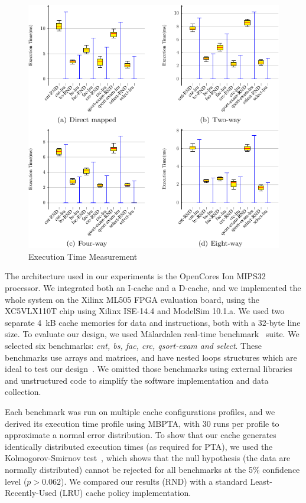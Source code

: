 \begin{figure}[t!]

 \centering
  \captionsetup{justification=centering}    
   \includegraphics[scale=0.8]{figures/img/boxplot.pdf}
   \caption{Execution Time Measurement}
\label{fig:boxplot}
\end{figure}
The architecture used in our experiments is the OpenCores Ion MIPS32
processor. We integrated both an I-cache and a D-cache, and we
implemented the whole system on the Xilinx ML505 FPGA evaluation
board, using the XC5VLX110T chip using  Xilinx ISE-14.4 and ModelSim 10.1.a. We used two separate 4~kB cache
memories for data and instructions, both with a 32-byte line size.  To
evaluate our design, we used M\"alardalen real-time benchmark~\cite{mrtc:bench} suite. We selected six benchmarks: \textit{cnt, bs,
  fac, crc, qsort-exam and select}. These benchmarks use arrays
and matrices, and have nested loops structures which are ideal to test
our design~\cite{Competitive}. We omitted those benchmarks using
external libraries and unstructured code to simplify the
software implementation and data collection. 



Each benchmark was run on multiple cache configurations profiles, and
we derived its execution time profile using MBPTA, with 30 runs per
profile to approximate a normal error distribution.
To show that our cache generates identically distributed execution times (as
required for PTA), we used the Kolmogorov-Smirnov test~\cite{books/daglib/0020904},
which shows that the null hypothesis (the data are normally distributed) cannot
be rejected for all benchmarks at the 5\% confidence level ($p>0.062$).
We compared our results (RND) with a standard Least-Recently-Used (LRU)
cache policy implementation.

